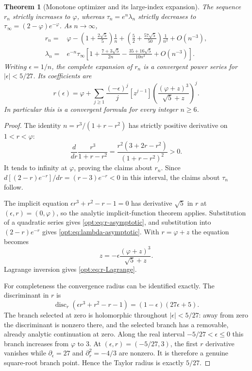 \documentclass[11pt,a4paper]{article}
\newtheorem{theorem}{Theorem}[section]
\theoremstyle{definition}
\theoremstyle{remark}
\numberwithin{equation}{section}
\begin{document}
\begin{theorem}[Monotone optimizer and its large-index expansion]
\label{opt:thm:asymptotic}
The sequence $r_n$ strictly increases to $\varphi$, whereas
$\tau_n=e^n\lambda_n$ strictly decreases to
$\tau_\infty=(2-\varphi)e^{-\varphi}$. As $n\to\infty$,
\begin{align}
 r_n={}&\varphi-
 \left(1+\frac{2\sqrt5}{5}\right)\frac1n
 +\left(\frac52+\frac{57\sqrt5}{50}\right)\frac1{n^2}
 +O(n^{-3}),\label{opt:eq:r-asymptotic}\\
 \lambda_n={}&e^{-n}\tau_\infty
 \left[1+\frac{7+3\sqrt5}{2n}
 -\frac{35+16\sqrt5}{10n^2}+O(n^{-3})\right].
 \label{opt:eq:lambda-asymptotic}
\end{align}
Writing $\epsilon=1/n$, the complete expansion of $r_n$ is a
convergent power series for $|\epsilon|<5/27$. Its coefficients are
\begin{equation}\label{opt:eq:r-Lagrange}
 r(\epsilon)=\varphi+
 \sum_{j\geq1}\frac{(-\epsilon)^j}{j}
 [z^{j-1}]
 \left(\frac{(\varphi+z)^3}{\sqrt5+z}\right)^j.
\end{equation}
In particular this is a convergent formula for every integer $n\geq6$.
\end{theorem}
\begin{proof}
The identity
$n=r^3/(1+r-r^2)$ has strictly positive derivative on $1<r<\varphi$:
\[
 \frac{d}{dr}\frac{r^3}{1+r-r^2}
 =\frac{r^2(3+2r-r^2)}{(1+r-r^2)^2}>0.
\]
It tends to infinity at $\varphi$, proving the claims about $r_n$.
Since $d[(2-r)e^{-r}]/dr=(r-3)e^{-r}<0$ in this interval,
the claims about $\tau_n$ follow.

The implicit equation
$\epsilon r^3+r^2-r-1=0$ has derivative $\sqrt5$ in $r$ at
$(\epsilon,r)=(0,\varphi)$, so the analytic implicit-function theorem
applies. Substitution of a quadratic series gives
\eqref{opt:eq:r-asymptotic}, and substitution into $(2-r)e^{-r}$ gives
\eqref{opt:eq:lambda-asymptotic}. With $r=\varphi+z$ the equation becomes
\[
 z=-\epsilon\frac{(\varphi+z)^3}{\sqrt5+z}.
\]
Lagrange inversion gives \eqref{opt:eq:r-Lagrange}.

For completeness the convergence radius can be identified exactly.
The discriminant in $r$ is
\[
 \operatorname{disc}_r(\epsilon r^3+r^2-r-1)
 =(1-\epsilon)(27\epsilon+5).
\]
The branch selected at zero is holomorphic throughout
$|\epsilon|<5/27$: away from zero the discriminant is nonzero there,
and the selected branch has a removable, already analytic continuation
at zero. Along the real interval $-5/27<\epsilon\leq0$ this branch
increases from $\varphi$ to $3$. At $(\epsilon,r)=(-5/27,3)$,
the first $r$ derivative vanishes while
$\partial_\epsilon=27$ and $\partial_r^2=-4/3$ are nonzero.
It is therefore a genuine square-root branch point. Hence the Taylor
radius is exactly $5/27$.
\end{proof}
\end{document}
